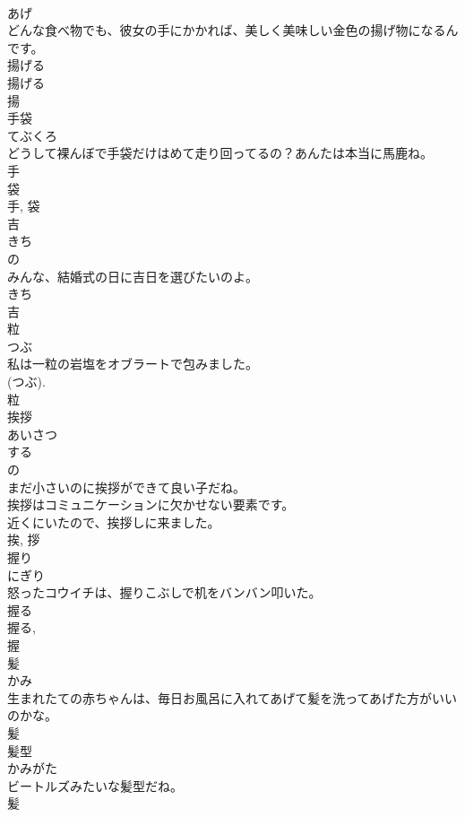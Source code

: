 \documentclass[8pt]{extreport}
\begin{document}
\begin{CJK}{UTF8}{min}
\\	あげ	
\\	どんな食べ物でも、彼女の手にかかれば、美しく美味しい金色の揚げ物になるんです。	
\\	揚げる 
\\	揚げる 
\\	揚	
\\	手袋	
\\	てぶくろ	
\\	どうして裸んぼで手袋だけはめて走り回ってるの？あんたは本当に馬鹿ね。	
\\	手 
\\	袋 
\\	手, 袋	
\\	吉	
\\	きち	
\\	の 
\\	みんな、結婚式の日に吉日を選びたいのよ。	
\\	きち 
\\	吉	
\\	粒	
\\	つぶ	
\\	私は一粒の岩塩をオブラートで包みました。	
\\	(つぶ). 
\\	粒	
\\	挨拶	
\\	あいさつ	
\\	する 
\\	の 
\\	まだ小さいのに挨拶ができて良い子だね。	
\\	挨拶はコミュニケーションに欠かせない要素です。	
\\	近くにいたので、挨拶しに来ました。	
\\	挨, 拶	
\\	握り	
\\	にぎり	
\\	怒ったコウイチは、握りこぶしで机をバンバン叩いた。	
\\	握る 
\\	握る, 
\\	握	
\\	髪	
\\	かみ	
\\	生まれたての赤ちゃんは、毎日お風呂に入れてあげて髪を洗ってあげた方がいいのかな。	
\\	髪	
\\	髪型	
\\	かみがた	
\\	ビートルズみたいな髪型だね。	
\\	髪 

\end{CJK}
\end{document}
